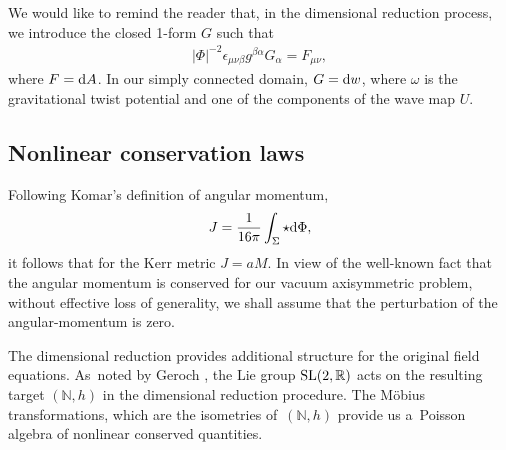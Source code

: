 \documentclass[11pt]{article}
\numberwithin{equation}{section}
\def\eps{\epsilon}%
\def \a{\alpha}
\def \b {\beta}
\renewcommand{\a}{\alpha}
\renewcommand{\b}{\beta}
\numberwithin{equation}{section}
\begin{document}
We would like to remind the reader that, in the dimensional reduction process, we introduce the closed 1-form $G$ such that
\begin{align*}
\vert \Phi \vert^{-2} \eps_{\mu \nu \b} g^{\b \a} G_\a = F_{\mu \nu},
\end{align*}
where $F = {\rm d}A$. In our simply connected domain, $G= {\rm d}w$, where $\omega$ is the gravitational twist potential and one of the components of the wave map $U$.


\subsection*{Nonlinear conservation laws}
Following Komar's definition of angular momentum,
\begin{align*}
J = \frac{1}{16\pi} \int_{\Sigma} \star {\rm d}\Phi, %
\end{align*}
it follows that for the Kerr metric $J = a M$. In view of the well-known fact that the angular momentum is conserved for our vacuum axisymmetric problem, without effective loss of generality, we shall assume that the perturbation of the angular-momentum is zero.

The dimensional reduction provides additional structure for the original field equations. As~noted by Geroch \cite{Geroch_71}, the Lie group ${\rm SL}(2, \mathbb{R})$ acts on the resulting target $(\mathbb{N}, h)$ in the dimensional reduction procedure. The M\"obius transformations, which are the isometries of~$(\mathbb{N}, h)$ provide us a~Poisson algebra of nonlinear conserved quantities.
\end{document}
